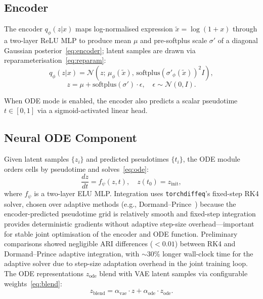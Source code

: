 \documentclass[preprint,12pt,number]{elsarticle}
\begin{document}
\subsection{Encoder}
\label{sec:method:encoder}

The encoder $q_\phi(z|x)$ maps log-normalised expression $\tilde{x} = \log(1 + x)$ through a two-layer ReLU MLP to produce mean $\mu$ and pre-softplus scale $\sigma'$ of a diagonal Gaussian posterior~\eqref{eq:encoder}; latent samples are drawn via reparameterisation~\eqref{eq:reparam}:
\begin{equation}
    q_\phi(z|x) = \mathcal{N}\!\left(z;\, \mu_\phi(\tilde{x}),\, \mathrm{softplus}(\sigma'_\phi(\tilde{x}))^2 I\right),
    \label{eq:encoder}
\end{equation}
\begin{equation}
    z = \mu + \mathrm{softplus}(\sigma') \cdot \epsilon, \quad \epsilon \sim \mathcal{N}(0, I).
    \label{eq:reparam}
\end{equation}

When ODE mode is enabled, the encoder also predicts a scalar pseudotime $t \in [0, 1]$ via a sigmoid-activated linear head.

\subsection{Neural ODE Component}
\label{sec:method:ode}

Given latent samples $\{z_i\}$ and predicted pseudotimes $\{t_i\}$, the ODE module orders cells by pseudotime and solves~\eqref{eq:ode}:
\begin{equation}
    \frac{dz}{dt} = f_\psi(z, t), \quad z(t_0) = z_{\mathrm{init}},
    \label{eq:ode}
\end{equation}
where $f_\psi$ is a two-layer ELU MLP. Integration uses \texttt{torchdiffeq}'s fixed-step RK4 solver, chosen over adaptive methods (e.g., Dormand--Prince~\cite{dormand1980rk}) because the encoder-predicted pseudotime grid is relatively smooth and fixed-step integration provides deterministic gradients without adaptive step-size overhead---important for stable joint optimisation of the encoder and ODE function. Preliminary comparisons showed negligible ARI differences ($<0.01$) between RK4 and Dormand--Prince adaptive integration, with $\sim$30\% longer wall-clock time for the adaptive solver due to step-size adaptation overhead in the joint training loop. The ODE representations $z_{\mathrm{ode}}$ blend with VAE latent samples via configurable weights~\eqref{eq:blend}:
\begin{equation}
    z_{\mathrm{blend}} = \alpha_{\mathrm{vae}} \cdot z + \alpha_{\mathrm{ode}} \cdot z_{\mathrm{ode}}.
    \label{eq:blend}
\end{equation}
\end{document}
